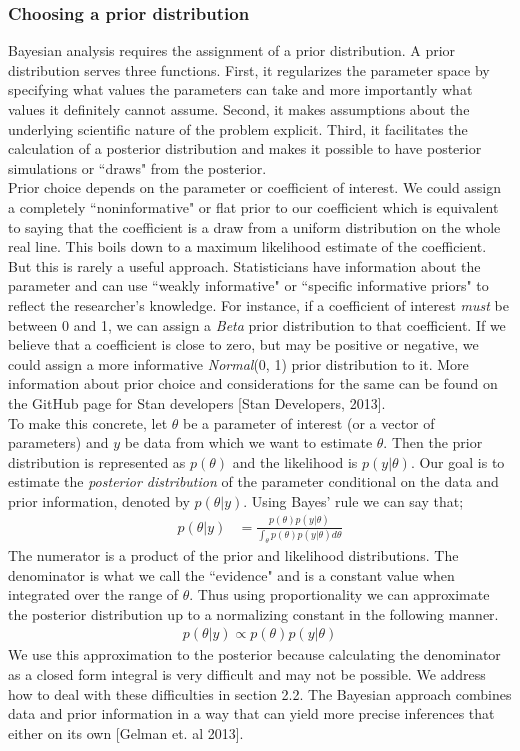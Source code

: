 \documentclass{article}
\begin{document}
\subsubsection{Choosing a prior distribution}
 Bayesian analysis requires the assignment of a prior distribution. A prior distribution serves three functions. First, it regularizes the parameter space by specifying what values the parameters can take and more importantly what values it definitely cannot assume. Second, it makes assumptions about the underlying scientific nature of the problem explicit. Third, it facilitates the calculation of a posterior distribution and makes it possible to have posterior simulations or ``draws" from the posterior. \\
 Prior choice depends on the parameter or coefficient of interest.  We could assign a completely ``noninformative" or flat prior to our coefficient which is equivalent to saying that the coefficient is a draw from a uniform distribution on the whole real line. This boils down to a maximum likelihood estimate of the coefficient. But this is rarely a useful approach. Statisticians have information about the parameter and can use ``weakly informative" or ``specific informative priors" to reflect the researcher's knowledge. For instance, if a coefficient of interest \emph{must} be between 0 and 1, we can assign a \emph{Beta} prior distribution to that coefficient.  If we believe that a coefficient is close to zero, but may be positive or negative, we could assign a more informative \emph{Normal}(0, 1) prior distribution to it.  More information about prior choice and considerations for the same can be found on the GitHub page for Stan developers [Stan Developers, 2013].\\
 To make this concrete, let $\theta$ be a parameter of interest (or a vector of parameters) and $y$ be data from which we want to estimate $\theta$.  Then the prior distribution is represented as $p(\theta)$ and the likelihood is $p(y | \theta)$. Our goal is to estimate the \textit{posterior distribution} of the parameter conditional on the data and prior information, denoted by $p(\theta | y)$. Using Bayes' rule we can say that;
  \begin{align*}
  p(\theta|y) &= \frac{ p(\theta) p(y |\theta)}{\int_{\theta} p(\theta) p(y |\theta) d\theta}
  \end{align*}
  The numerator is a product of the prior and likelihood distributions. The denominator is what we call the ``evidence" and is a constant value when integrated over the range of $\theta$. Thus using proportionality we can approximate the posterior distribution up to a normalizing constant in the following manner.
   \begin{align*}
 p(\theta | y) \propto p(\theta) p(y |\theta)
 \end{align*}
 We use this approximation to the posterior because calculating the denominator as a closed form integral is very difficult and may not be possible. We address how to deal with these difficulties in section 2.2. The Bayesian approach combines data and prior information in a way that can yield more precise inferences that either on its own [Gelman et. al 2013].
\end{document}
